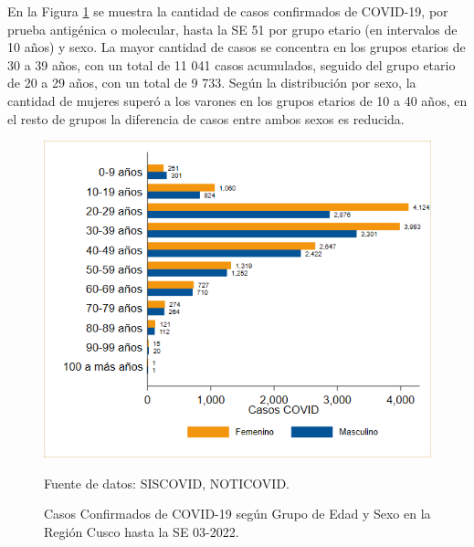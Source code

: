 \documentclass[12pt,a4paper,openany]{book}
\begin{document}
 	\noindent En la Figura \ref{fig:casos_edad_sexo} se muestra la cantidad de casos confirmados de COVID-19, por prueba antigénica o molecular, hasta la SE 51 por grupo etario (en intervalos de 10 años) y sexo. La mayor cantidad de casos se concentra en los grupos etarios de 30 a 39 años, con un total de 11 041 casos acumulados, seguido del grupo etario de 20 a 29 años, con un total de 9 733. Según la distribución por sexo, la cantidad de mujeres superó a los varones en los grupos etarios de 10 a 40 años, en el resto de grupos la diferencia de casos entre ambos sexos es reducida.  
 	
 	
 	
	\begin{figure}[h]
		\caption{Casos Confirmados de COVID-19 según Grupo de Edad y Sexo en la Región Cusco hasta la SE 03-2022.}\label{fig:casos_edad_sexo}
		\begin{center}
			\includegraphics[width=0.75\linewidth]{../figuras/casos_etapavida_2022}
		\end{center}
		{\footnotesize {Fuente de datos: SISCOVID, NOTICOVID.}}
	\end{figure}
\pagebreak
\end{document}
